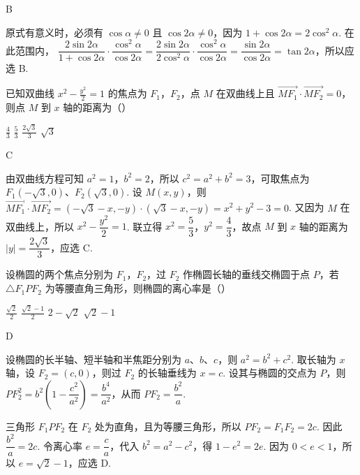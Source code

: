 \begin{answer}
B
\end{answer}

\begin{solution}
原式有意义时，必须有 \(\cos\alpha\ne0\) 且 \(\cos2\alpha\ne0\)，因为 \(1+\cos2\alpha=2\cos^2\alpha\). 在此范围内，
\(\dfrac{2\sin2\alpha}{1+\cos2\alpha}\cdot\dfrac{\cos^2\alpha}{\cos2\alpha}=\dfrac{2\sin2\alpha}{2\cos^2\alpha}\cdot\dfrac{\cos^2\alpha}{\cos2\alpha}=\dfrac{\sin2\alpha}{\cos2\alpha}=\tan2\alpha\)，所以应选 B.
\end{solution}



\begin{problem}
已知双曲线 \(x^{2} - \frac{y^{2}}{2} = 1\) 的焦点为 \(F_{1}\)，\(F_{2}\)，点 \(M\) 在双曲线上且 \(\overrightarrow{MF_1} \cdot \overrightarrow{MF_2} = 0\)，则点 \(M\) 到 \(x\) 轴的距离为（\quad）

\choices
    {\(\frac{4}{3}\)}
    {\(\frac{5}{3}\)}
    {\(\frac{2\sqrt{3}}{3}\)}
    {\(\sqrt{3}\)}
\end{problem}

\begin{answer}
C
\end{answer}

\begin{solution}
由双曲线方程可知 \(a^2=1\)，\(b^2=2\)，所以 \(c^2=a^2+b^2=3\)，可取焦点为 \(F_1(-\sqrt3,0)\)、\(F_2(\sqrt3,0)\). 设 \(M(x,y)\)，则
\(\overrightarrow{MF_1}\cdot\overrightarrow{MF_2}=(-\sqrt3-x,-y)\cdot(\sqrt3-x,-y)=x^2+y^2-3=0\).
又因为 \(M\) 在双曲线上，所以 \(x^2-\dfrac{y^2}{2}=1\). 联立得 \(x^2=\dfrac53\)，\(y^2=\dfrac43\)，故点 \(M\) 到 \(x\) 轴的距离为 \(\lvert y\rvert=\dfrac{2\sqrt3}{3}\)，应选 C.
\end{solution}



\begin{problem}
设椭圆的两个焦点分别为 \(F_{1}\)，\(F_{2}\)，过 \(F_{2}\) 作椭圆长轴的垂线交椭圆于点 \(P\)，若 \(\triangle F_{1}PF_{2}\) 为等腰直角三角形，则椭圆的离心率是（\quad）

\choices
    {\(\frac{\sqrt{2}}{2}\)}
    {\(\frac{\sqrt{2} - 1}{2}\)}
    {\(2 - \sqrt{2}\)}
    {\(\sqrt{2} - 1\)}
\end{problem}

\begin{answer}
D
\end{answer}

\begin{solution}
设椭圆的长半轴、短半轴和半焦距分别为 \(a\)、\(b\)、\(c\)，则 \(a^2=b^2+c^2\). 取长轴为 \(x\) 轴，设 \(F_2=(c,0)\)，则过 \(F_2\) 的长轴垂线为 \(x=c\). 设其与椭圆的交点为 \(P\)，则
\(PF_2^2=b^2\left(1-\dfrac{c^2}{a^2}\right)=\dfrac{b^4}{a^2}\)，从而 \(PF_2=\dfrac{b^2}{a}\).

三角形 \(F_1PF_2\) 在 \(F_2\) 处为直角，且为等腰三角形，所以 \(PF_2=F_1F_2=2c\). 因此 \(\dfrac{b^2}{a}=2c\). 令离心率 \(e=\dfrac ca\)，代入 \(b^2=a^2-c^2\)，得 \(1-e^2=2e\). 因为 \(0<e<1\)，所以 \(e=\sqrt2-1\)，应选 D.
\end{solution}



